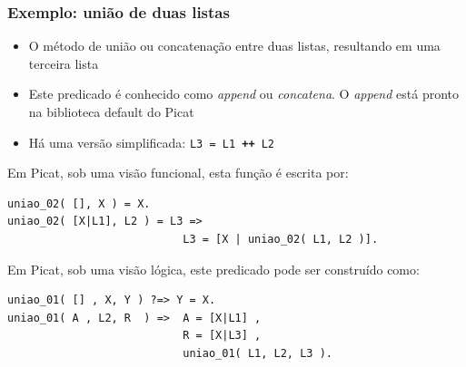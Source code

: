 \begin{frame}[fragile, allowframebreaks=0.9]
\frametitle{Exemplo: união de duas listas}

\begin{itemize}
  \item O método de  união ou concatenação entre duas listas,
 resultando em uma terceira lista

 \item Este predicado é conhecido como \textit{append} ou \textit{concatena}. O \textit{append} está 
pronto na  biblioteca default do Picat

\item Há uma versão simplificada: \texttt{L3 = L1 \textbf{++} L2}

\end{itemize}

Em Picat, sob uma visão funcional, esta função é escrita por:
\begin{verbatim}
uniao_02( [], X ) = X. 
uniao_02( [X|L1], L2 ) = L3 => 
                           L3 = [X | uniao_02( L1, L2 )].
\end{verbatim}

\framebreak

Em Picat, sob uma visão lógica, este predicado 
pode ser construído como:

\begin{verbatim}
uniao_01( [] , X, Y ) ?=> Y = X. 
uniao_01( A , L2, R  ) =>  A = [X|L1] , 
                           R = [X|L3] , 
                           uniao_01( L1, L2, L3 ).
\end{verbatim}

\end{frame}


